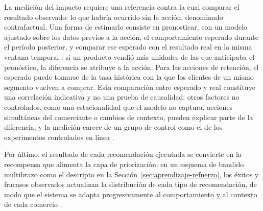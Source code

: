 La medición del impacto requiere una referencia contra la cual comparar el resultado observado: lo que habría ocurrido sin la acción, denominado contrafactual. Una forma de estimarlo consiste en pronosticar, con un modelo ajustado sobre los datos previos a la acción, el comportamiento esperado durante el período posterior, y comparar ese esperado con el resultado real en la misma ventana temporal \parencite{Brodersen2015}: si un producto vendió más unidades de las que anticipaba el pronóstico, la diferencia se atribuye a la acción. Para las acciones de retención, el esperado puede tomarse de la tasa histórica con la que los clientes de un mismo segmento vuelven a comprar. Esta comparación entre esperado y real constituye una correlación indicativa y no una prueba de causalidad: otros factores no controlados, como una estacionalidad que el modelo no captura, acciones simultáneas del comerciante o cambios de contexto, pueden explicar parte de la diferencia, y la medición carece de un grupo de control como el de los experimentos controlados en línea \parencite{Shani2011}.

Por último, el resultado de cada recomendación ejecutada se convierte en la recompensa que alimenta la capa de priorización: en un esquema de bandido multibrazo como el descripto en la Sección~\ref{sec:aprendizaje-refuerzo}, los éxitos y fracasos observados actualizan la distribución de cada tipo de recomendación, de modo que el sistema se adapta progresivamente al comportamiento y al contexto de cada comercio \parencite{Sutton2018}.
